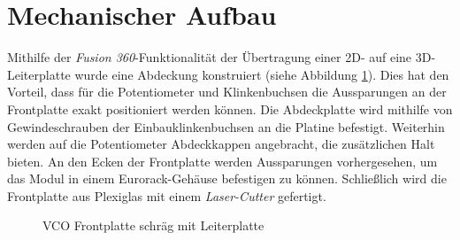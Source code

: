 \newpage
\section{Mechanischer Aufbau}
Mithilfe der \textit{Fusion 360}-Funktionalität der Übertragung einer 2D- auf eine 3D-Leiterplatte wurde eine Abdeckung konstruiert (siehe Abbildung \ref{fig:VCO Frontplattemit 3D-Leiterplatte}).
Dies hat den Vorteil, dass für die Potentiometer und Klinkenbuchsen die Aussparungen an der Frontplatte exakt positioniert werden können.
Die Abdeckplatte wird mithilfe von Gewindeschrauben der Einbauklinkenbuchsen an die Platine befestigt.
Weiterhin werden auf die Potentiometer Abdeckkappen angebracht, die zusätzlichen Halt bieten.
An den Ecken der Frontplatte werden Aussparungen vorhergesehen, um das Modul in einem Eurorack-Gehäuse befestigen zu können.
Schließlich wird die Frontplatte aus Plexiglas mit einem \textit{Laser-Cutter} gefertigt.


\begin{figure}[h]
	\centering
	\setlength{\fboxsep}{1pt} %
	\setlength{\fboxrule}{1pt} %
	\caption{VCO Frontplatte schräg mit Leiterplatte}
	\label{fig:VCO Frontplattemit 3D-Leiterplatte}
\end{figure}

